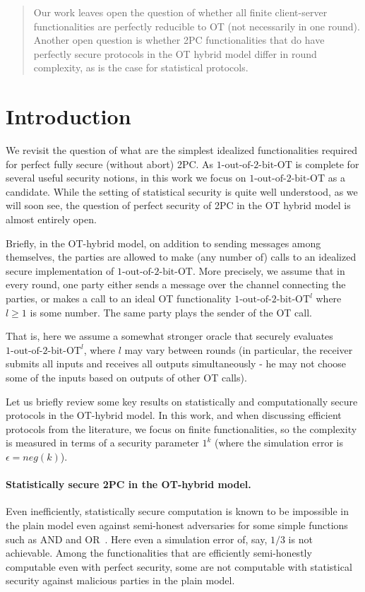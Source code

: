 \documentclass[a4paper]{article}
\newcommand{\OT}[2]{#1\text{-out-of-}#2\text{-bit-OT}}
\begin{document}
\begin{abstract}
Our work leaves open the question of whether all finite client-server functionalities are perfectly reducible to OT (not necessarily in one round). 
Another open question is whether 2PC functionalities that do have perfectly secure protocols in the OT hybrid model differ in round complexity, as is the case for statistical protocols.
\end{abstract}

\section{Introduction}

We revisit the question of what are the simplest idealized functionalities required for perfect fully secure (without abort) 2PC. 
As $\OT{1}{2}$ is complete for several useful security notions, in this work we focus on $\OT{1}{2}$ as a candidate. While the setting of statistical security is quite well understood, as we will soon see, the question of perfect security of 2PC in the OT hybrid model is almost entirely open. 

Briefly, in the OT-hybrid model, on addition to sending messages among themselves, the parties are allowed to make (any number of) calls to an idealized secure implementation of $\OT{1}{2}$. 
More precisely, we assume that in every round, one party either sends a message over the channel connecting the parties, or makes a call to an ideal OT functionality ${\OT{1}{2}}^l$ where $l\geq 1$
is some number. The same party plays the sender of the OT call.

That is, here we assume a somewhat stronger oracle that securely evaluates ${\OT{1}{2}}^l$, where $l$ may vary between rounds (in particular, the receiver submits all inputs and receives all outputs simultaneously - he may not choose some of the inputs based on outputs of other OT calls).

Let us briefly review some key results on statistically and computationally secure protocols in the OT-hybrid model. %
In this work, and when discussing efficient protocols from the literature, we focus on finite functionalities, so the complexity is measured in terms of a security parameter $1^k$ (where the simulation error is $\epsilon = neg(k)$).
 
\paragraph{Statistically secure 2PC in the OT-hybrid model.} Even inefficiently, statistically secure computation is known to be impossible in the plain model even against semi-honest adversaries for some simple functions such as AND and OR~\cite{CK89}.
Here even a simulation error of, say, $1/3$ is not achievable.
Among the functionalities that are efficiently semi-honestly computable even with perfect security, some are not computable with statistical security against malicious parties in the plain model.
\end{document}
